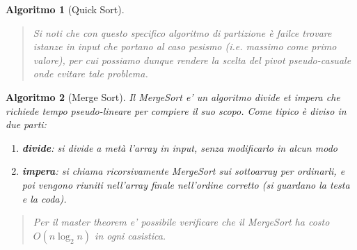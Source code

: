 \documentclass[oneside]{book}
\newtheorem{alg}{Algoritmo}
\begin{document}
\begin{alg}[Quick Sort]
\begin{quote}
    Si noti che con questo specifico algoritmo di partizione \`e failce trovare
    istanze in input che portano al caso pesismo (i.e. massimo come primo valore),
    per cui possiamo dunque rendere la scelta del pivot pseudo-casuale onde
    evitare tale problema.
  \end{quote}
\end{alg}

\begin{alg}[Merge Sort]
  Il MergeSort e' un algoritmo divide et impera che richiede tempo pseudo-lineare
  per compiere il suo scopo. Come tipico \`e diviso in due parti:
  \begin{enumerate}
    \item \textbf{divide}: si divide a met\`a l'array in input, senza modificarlo in alcun modo
    \item \textbf{impera}: si chiama ricorsivamente MergeSort sui sottoarray per
      ordinarli, e poi vengono riuniti nell'array finale nell'ordine corretto
      (si guardano la testa e la coda).
  \end{enumerate}

  \begin{algorithm}[H]

    \;
  \end{algorithm}
  \begin{algorithm}[H]

  \end{algorithm}
  \begin{quote}
    Per il master theorem e' possibile verificare che il MergeSort ha costo
    $O(n \log_2 n)$ in ogni casistica.
  \end{quote}
\end{alg}
\end{document}

